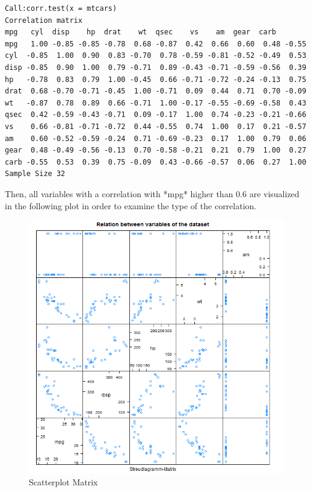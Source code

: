 \documentclass[10pt,a4paper]{article}
\begin{document}
\begin{verbatim}
Call:corr.test(x = mtcars)
Correlation matrix 
mpg   cyl  disp    hp  drat    wt  qsec    vs    am  gear  carb
mpg   1.00 -0.85 -0.85 -0.78  0.68 -0.87  0.42  0.66  0.60  0.48 -0.55
cyl  -0.85  1.00  0.90  0.83 -0.70  0.78 -0.59 -0.81 -0.52 -0.49  0.53
disp -0.85  0.90  1.00  0.79 -0.71  0.89 -0.43 -0.71 -0.59 -0.56  0.39
hp   -0.78  0.83  0.79  1.00 -0.45  0.66 -0.71 -0.72 -0.24 -0.13  0.75
drat  0.68 -0.70 -0.71 -0.45  1.00 -0.71  0.09  0.44  0.71  0.70 -0.09
wt   -0.87  0.78  0.89  0.66 -0.71  1.00 -0.17 -0.55 -0.69 -0.58  0.43
qsec  0.42 -0.59 -0.43 -0.71  0.09 -0.17  1.00  0.74 -0.23 -0.21 -0.66
vs    0.66 -0.81 -0.71 -0.72  0.44 -0.55  0.74  1.00  0.17  0.21 -0.57
am    0.60 -0.52 -0.59 -0.24  0.71 -0.69 -0.23  0.17  1.00  0.79  0.06
gear  0.48 -0.49 -0.56 -0.13  0.70 -0.58 -0.21  0.21  0.79  1.00  0.27
carb -0.55  0.53  0.39  0.75 -0.09  0.43 -0.66 -0.57  0.06  0.27  1.00
Sample Size 32
\end{verbatim}
Then, all variables with a correlation with *mpg* higher than 0.6 are visualized in the following plot in order to examine the type of the correlation.

\begin{figure}
\centering
\includegraphics[width=1.0\linewidth]{scatterplot_matrix}
\caption{Scatterplot Matrix}
\end{figure}
\end{document}
